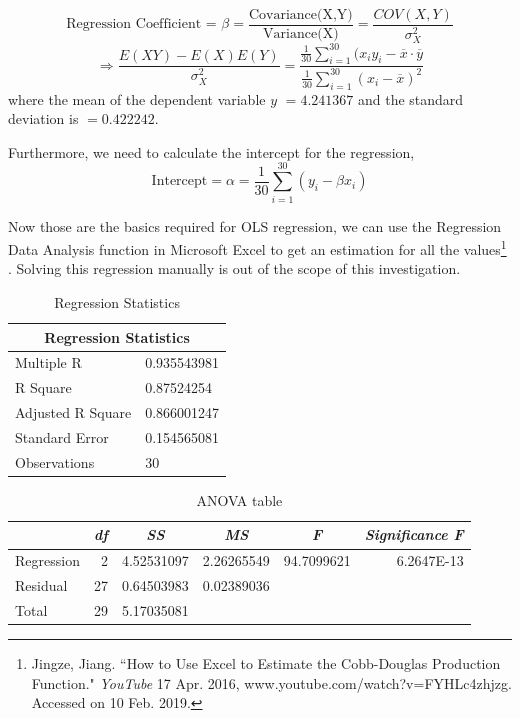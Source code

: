 \documentclass[a4paper,12pt]{article}
\theoremstyle{definition}
\begin{document}
\begin{equation}
	\text{Regression Coefficient = } \beta =\frac{\text{Covariance(X,Y)}}{\text{Variance(X)}}=\frac{COV(X,Y)}{\sigma_X^2}
\end{equation}
\begin{equation}
	\Rightarrow \frac{E(XY)-E(X)E(Y)}{\sigma_X^2}=\frac{\frac{1}{30}\sum\limits_{i=1}^{30}(x_iy_i- \overline{x}\cdot \overline{y}}{\frac{1}{30}\sum\limits_{i=1}^{30}(x_i- \overline{x})^2}
\end{equation}
where the mean of the dependent variable $y$ $=4.241367$ and the standard deviation is $=0.422242$.

Furthermore, we need to calculate the intercept for the regression,
\begin{equation}
	\text{Intercept} = \alpha = \frac{1}{30}\sum^{30}_{i=1}(y_i- \beta x_i)
\end{equation}

Now those are the basics required for OLS regression, we can use the Regression Data Analysis function in Microsoft Excel to get an estimation for all the values\footnote{Jingze, Jiang. ``How to Use Excel to Estimate the Cobb-Douglas Production Function." \textit{YouTube} 17 Apr. 2016, www.youtube.com/watch?v=FYHLc4zhjzg. Accessed on 10 Feb. 2019.} . Solving this regression manually is out of the scope of this investigation.



\begin{table}[H]
\centering
\caption{Regression Statistics}
\begin{tabular}{*2l}
\toprule
\multicolumn{2}{c}{Regression Statistics}\\
\midrule
	Multiple R & 0.935543981 \\ 
	R Square & 0.87524254 \\ 
	Adjusted R Square & 0.866001247 \\ 
	Standard Error & 0.154565081 \\ 
	Observations & 30 \\ 
\bottomrule
\end{tabular}
\end{table}




\begin{table}[H]
  \centering
  \caption{ANOVA table}
    \begin{tabular}{lrrrrr}
    \toprule
          & \multicolumn{1}{c}{\textit{df}} & \multicolumn{1}{c}{\textit{SS}} & \multicolumn{1}{c}{\textit{MS}} & \multicolumn{1}{c}{\textit{F}} & \multicolumn{1}{c}{\textit{Significance F}} \\
    \midrule
    Regression & 2     & 4.52531097 & 2.26265549 & 94.7099621 & 6.2647E-13 \\
    Residual & 27    & 0.64503983 & 0.02389036 &       &  \\
    Total & 29    & 5.17035081 &       &       &  \\
    \bottomrule
    \end{tabular}%
  \label{tab:anova}%
\end{table}%
\end{document}

